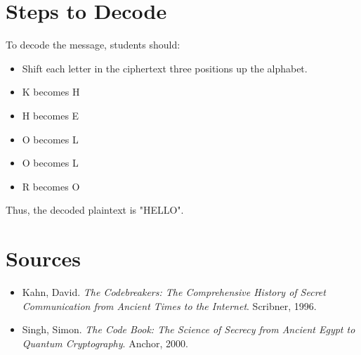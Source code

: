 \section*{Steps to Decode}
To decode the message, students should:
\begin{itemize}
    \item Shift each letter in the ciphertext three positions up the alphabet.
    \item K becomes H
    \item H becomes E
    \item O becomes L
    \item O becomes L
    \item R becomes O
\end{itemize}
Thus, the decoded plaintext is "HELLO".




\section*{Sources}
\begin{itemize}
    \item Kahn, David. \textit{The Codebreakers: The Comprehensive History of Secret Communication from Ancient Times to the Internet}. Scribner, 1996.
    \item Singh, Simon. \textit{The Code Book: The Science of Secrecy from Ancient Egypt to Quantum Cryptography}. Anchor, 2000.
\end{itemize}
